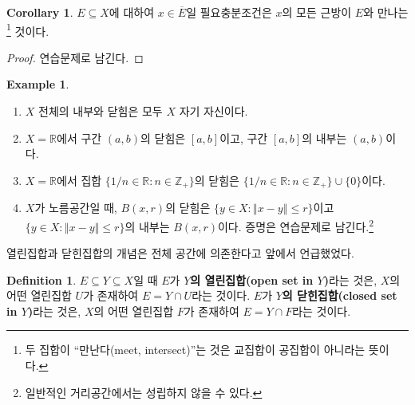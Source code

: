 \documentclass[11pt]{book}
\numberwithin{equation}{chapter}
\def\ZZ{\mathbb{Z}}
\def\RR{\mathbb{R}}
\newcommand{\norm}[1]{\left\Vert#1\right\Vert}
\theoremstyle{definition}
\newtheorem{cor}[thm]{Corollary}
\newtheorem{defn}[thm]{Definition}
\newtheorem*{ex}{Example}
\begin{document}
\begin{cor}
    \(E \subseteq X\)에 대하여 \(x \in \overline{E}\)일 필요충분조건은 \(x\)의 모든 근방이 \(E\)와 만나는\footnote{두 집합이 ``만난다(meet, intersect)''는 것은 교집합이 공집합이 아니라는 뜻이다.} 것이다.
\end{cor}
\begin{proof}
    연습문제로 남긴다.
\end{proof}

\begin{ex}
    \quad

    \begin{enumerate} [label=(\alph*), leftmargin=2\parindent]
        \item \(X\) 전체의 내부와 닫힘은 모두 \(X\) 자기 자신이다.
        \item \(X = \RR\)에서 구간 \((a, b)\)의 닫힘은 \([a, b]\)이고, 구간 \([a, b]\)의 내부는 \((a, b)\)이다.
        \item \(X = \RR\)에서 집합 \(\{1/n \in \RR : n \in \ZZ_+\}\)의 닫힘은 \(\{1/n \in \RR : n \in \ZZ_+\} \cup \{0\}\)이다.
        \item \(X\)가 노름공간일 때, \(B(x, r)\)의 닫힘은 \(\{y \in X : \norm{x - y} \le r\}\)이고 \(\{y \in X : \norm{x - y} \le r\}\)의 내부는 \(B(x, r)\)이다. 증명은 연습문제로 남긴다.\footnote{일반적인 거리공간에서는 성립하지 않을 수 있다. }
    \end{enumerate}
\end{ex}

열린집합과 닫힌집합의 개념은 전체 공간에 의존한다고 앞에서 언급했었다.

\begin{defn} \label{def 4.1.11}
    \(E \subseteq Y \subseteq X\)일 때 \(E\)가 \textbf{\(Y\)의 열린집합(open set in \(Y\))}라는 것은, \(X\)의 어떤 열린집합 \(U\)가 존재하여 \(E = Y \cap U\)라는 것이다. \(E\)가 \textbf{\(Y\)의 닫힌집합(closed set in \(Y\))}라는 것은, \(X\)의 어떤 열린집합 \(F\)가 존재하여 \(E = Y \cap F\)라는 것이다.
\end{defn}
\end{document}
